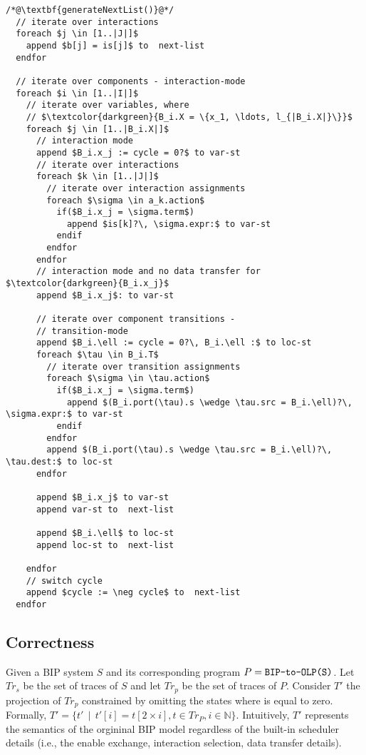 \begin{lstlisting}
/*@\textbf{generateNextList()}@*/ 
  // iterate over interactions
  foreach $j \in [1..|J|]$ 
    append $b[j] = is[j]$ to  next-list 
  endfor

  // iterate over components - interaction-mode
  foreach $i \in [1..|I|]$ 
    // iterate over variables, where 
    // $\textcolor{darkgreen}{B_i.X = \{x_1, \ldots, l_{|B_i.X|}\}}$ 
    foreach $j \in [1..|B_i.X|]$ 
      // interaction mode
      append $B_i.x_j := cycle = 0?$ to var-st
      // iterate over interactions
      foreach $k \in [1..|J|]$ 
        // iterate over interaction assignments
        foreach $\sigma \in a_k.action$
          if($B_i.x_j = \sigma.term$)
            append $is[k]?\, \sigma.expr:$ to var-st
          endif
        endfor
      endfor
      // interaction mode and no data transfer for $\textcolor{darkgreen}{B_i.x_j}$
      append $B_i.x_j$: to var-st 
      
      // iterate over component transitions - 
      // transition-mode
      append $B_i.\ell := cycle = 0?\, B_i.\ell :$ to loc-st
      foreach $\tau \in B_i.T$ 
        // iterate over transition assignments
        foreach $\sigma \in \tau.action$
          if($B_i.x_j = \sigma.term$)
            append $(B_i.port(\tau).s \wedge \tau.src = B_i.\ell)?\, \sigma.expr:$ to var-st 
          endif
        endfor
        append $(B_i.port(\tau).s \wedge \tau.src = B_i.\ell)?\, \tau.dest:$ to loc-st 
      endfor  
      
      append $B_i.x_j$ to var-st 
      append var-st to  next-list 
      
      append $B_i.\ell$ to loc-st 
      append loc-st to  next-list 

    endfor
    // switch cycle
    append $cycle := \neg cycle$ to  next-list 
  endfor
\end{lstlisting}



\subsection{Correctness}
Given a BIP system $S$ and its corresponding \caig program $P = \texttt{BIP-to-OLP(S)}$. 
Let $Tr_s$ be the set of traces of $S$ and let $Tr_p$ be the set of traces of $P$. 
Consider $T'$ the projection of $Tr_p$ constrained by omitting the states where  is equal to zero. 
Formally, $T'  = \{t' \,\mid\, t'[i] = t[2\times i], t \in Tr_P, i \in \mathbb{N}\}$. 
Intuitively, $T'$ represents the semantics of the orgininal BIP model regardless of the built-in scheduler details 
(i.e., the enable exchange, interaction selection, data transfer details). 

